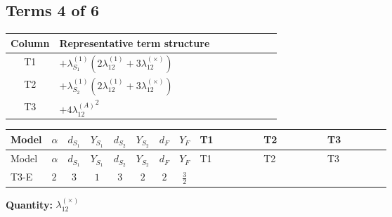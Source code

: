 \documentclass[8pt]{article}
\begin{document}
\begin{landscape}
\subsection*{Terms 4 of 6}
\begin{center}
\begin{tabular}{@{}c >{\raggedright\arraybackslash}p{0.82\linewidth}@{}}
\toprule
Column & Representative term structure \\
\midrule
T1 & \(\displaystyle +{\lambda_{S_1}^{(1)}} (2 {\lambda_{12}^{(1)}}+3 {\lambda_{12}^{(\times)}})\) \\
\midrule
T2 & \(\displaystyle +{\lambda_{S_2}^{(1)}} (2 {\lambda_{12}^{(1)}}+3 {\lambda_{12}^{(\times)}})\) \\
\midrule
T3 & \(\displaystyle +4 {\lambda_{12}^{(A)}}^2\) \\
\midrule
\bottomrule
\end{tabular}
\end{center}
\smallskip
\tiny
\begin{longtable}{@{}llcccccc >{\raggedright\arraybackslash}p{0.21\linewidth} >{\raggedright\arraybackslash}p{0.21\linewidth} >{\raggedright\arraybackslash}p{0.21\linewidth}@{}}
\toprule
Model & $\alpha$ & $d_{S_1}$ & $Y_{S_1}$ & $d_{S_2}$ & $Y_{S_2}$ & $d_F$ & $Y_F$ & T1 & T2 & T3 \\
\midrule
\endfirsthead
\toprule
Model & $\alpha$ & $d_{S_1}$ & $Y_{S_1}$ & $d_{S_2}$ & $Y_{S_2}$ & $d_F$ & $Y_F$ & T1 & T2 & T3 \\
\midrule
\endhead
T3-E & $2$ & $3$ & $1$ & $3$ & $2$ & $2$ & $\frac{3}{2}$ & \scriptsize\adjustbox{max width=\linewidth}{$\begin{gathered} +{\lambda_{S_1}^{(1)}} (2 {\lambda_{12}^{(1)}}+3 {\lambda_{12}^{(\times)}})\end{gathered}$} & \scriptsize\adjustbox{max width=\linewidth}{$\begin{gathered} +{\lambda_{S_2}^{(1)}} (2 {\lambda_{12}^{(1)}}+3 {\lambda_{12}^{(\times)}})\end{gathered}$} & \scriptsize\adjustbox{max width=\linewidth}{$\begin{gathered} +4 {\lambda_{12}^{(A)}}^2\end{gathered}$} \\
\midrule
\bottomrule
\end{longtable}
\clearpage
\noindent\textbf{Quantity: }$\lambda_{12}^{(\times)}$\par\smallskip

\end{landscape}
\end{document}
